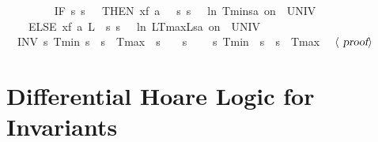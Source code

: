 \documentclass[envcountsame]{llncs}
\begin{document}
\begin{example}
\begin{isabellebody}
\ \ \ \ %
\isanewline
\ \ \ \ {\isacharparenleft}IF\ {\isacharparenleft}{\isasymlambda}s{\isachardot}\ s{\isachardollar}{}\ {\isacharequal}\ {}{\isacharparenright}\ THEN\ {\isacharparenleft}x{\isasymacute}{\isacharequal}{\isacharparenleft}f\ a\ {}{\isacharparenright}\ {\isacharampersand}\ {\isacharparenleft}{\isasymlambda}s{\isachardot}\ s{\isachardollar}{}\ {\isasymle}\ {\isacharminus}\ {\isacharparenleft}ln\ {\isacharparenleft}Tmin{\isacharslash}s{\isachardollar}{}{\isacharparenright}{\isacharparenright}{\isacharslash}a{\isacharparenright}\ on\ {\isacharbraceleft}{}{\isachardot}{\isachardot}{\isasymtau}{\isacharbraceright}\ UNIV\ {\isacharat}\ {}{\isacharparenright}\ \isanewline
\ \ \ \ ELSE\ {\isacharparenleft}x{\isasymacute}{\isacharequal}{\isacharparenleft}f\ a\ L{\isacharparenright}\ {\isacharampersand}\ {\isacharparenleft}{\isasymlambda}s{\isachardot}\ s{\isachardollar}{}\ {\isasymle}\ {\isacharminus}\ {\isacharparenleft}ln\ {\isacharparenleft}{\isacharparenleft}L{\isacharminus}Tmax{\isacharparenright}{\isacharslash}{\isacharparenleft}L{\isacharminus}s{\isachardollar}{}{\isacharparenright}{\isacharparenright}{\isacharparenright}{\isacharslash}a{\isacharparenright}\ on\ {\isacharbraceleft}{}{\isachardot}{\isachardot}{\isasymtau}{\isacharbraceright}\ UNIV\ {\isacharat}\ {}{\isacharparenright}{\isacharparenright}\ {\isacharparenright}\isanewline
\ \ INV\ {\isacharparenleft}{\isasymlambda}s{\isachardot}\ Tmin\ {\isasymle}s{\isachardollar}{}\ {\isasymand}\ s{\isachardollar}{}\ {\isasymle}\ Tmax\ {\isasymand}\ {\isacharparenleft}s{\isachardollar}{}\ {\isacharequal}\ {}\ {\isasymor}\ s{\isachardollar}{}\ {\isacharequal}\ {}{\isacharparenright}{\isacharparenright}{\isacharparenright}\isanewline
\ \ {\isasymlceil}{\isasymlambda}s{\isachardot}\ Tmin\ {\isasymle}\ s{\isachardollar}{}\ {\isasymand}\ s{\isachardollar}{}\ {\isasymle}\ Tmax{\isasymrceil}{\isachardoublequoteclose}\isanewline
\ \ $\langle \isa{proof}\rangle$\isanewline
\end{isabellebody}
\end{example}


\section{Differential Hoare Logic for Invariants}\label{sec:hoare-inv}
\end{document}

